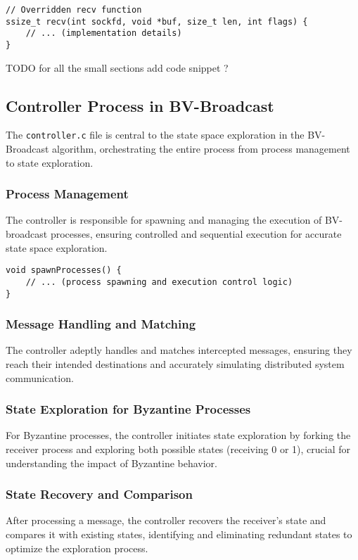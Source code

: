 \documentclass[a4paper,11pt,oneside]{report}
\begin{document}
\begin{verbatim}
// Overridden recv function
ssize_t recv(int sockfd, void *buf, size_t len, int flags) {
    // ... (implementation details)
}
\end{verbatim}

TODO for all the small sections add code snippet ?
\subsection{Controller Process in BV-Broadcast}
The \texttt{controller.c} file is central to the state space exploration in the BV-Broadcast algorithm, orchestrating the entire process from process management to state exploration.

\subsubsection{Process Management}
The controller is responsible for spawning and managing the execution of BV-broadcast processes, ensuring controlled and sequential execution for accurate state space exploration.

\begin{verbatim}
void spawnProcesses() {
    // ... (process spawning and execution control logic)
}
\end{verbatim}

\subsubsection{Message Handling and Matching}
The controller adeptly handles and matches intercepted messages, ensuring they reach their intended destinations and accurately simulating distributed system communication.

\subsubsection{State Exploration for Byzantine Processes}
For Byzantine processes, the controller initiates state exploration by forking the receiver process and exploring both possible states (receiving 0 or 1), crucial for understanding the impact of Byzantine behavior.

\subsubsection{State Recovery and Comparison}
After processing a message, the controller recovers the receiver's state and compares it with existing states, identifying and eliminating redundant states to optimize the exploration process.
\end{document}
